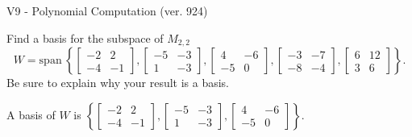 \begin{exercise}
  \begin{exerciseTitle}V9 - Polynomial Computation (ver. 924)\end{exerciseTitle}
  \begin{exerciseStatement}
    Find a basis for the subspace of \(M_{2,2}\) 
\[W=\mathrm{span}\ \left\{\left[\begin{array}{cc}
-2 & 2 \\
-4 & -1
\end{array}\right] , \left[\begin{array}{cc}
-5 & -3 \\
1 & -3
\end{array}\right] , \left[\begin{array}{cc}
4 & -6 \\
-5 & 0
\end{array}\right] , \left[\begin{array}{cc}
-3 & -7 \\
-8 & -4
\end{array}\right] , \left[\begin{array}{cc}
6 & 12 \\
3 & 6
\end{array}\right]\right\}.\]
 Be sure to explain why your result is a basis.


  \end{exerciseStatement}
  \begin{exerciseAnswer}
   A basis of \(W\) is  \(\left\{\left[\begin{array}{cc}
-2 & 2 \\
-4 & -1
\end{array}\right] , \left[\begin{array}{cc}
-5 & -3 \\
1 & -3
\end{array}\right] , \left[\begin{array}{cc}
4 & -6 \\
-5 & 0
\end{array}\right]\right\}\).
  


  \end{exerciseAnswer}
\end{exercise}